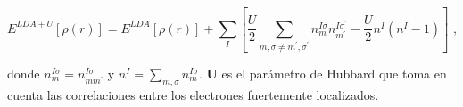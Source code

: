 \begin{equation}\label{hubb_rescrito}
E^{LDA+U} [\rho (r)]= E^{LDA} [\rho (r)] + \sum _{I} \left[ \frac{U}{2} \sum 
_{m,\sigma \neq m^{\prime},\sigma ^{\prime}} n_{m}^{I\sigma} 
n_{m^{\prime}}^{I\sigma ^{\prime}} - \frac{U}{2} n^{I}(n^{I}-1) \right] 
\textrm{ ,}
\end{equation}

\noindent donde $n_{m}^{I\sigma} = n_{mm^{\prime}}^{I\sigma}$ y $n^{I} = \sum 
_{m,\sigma 
} n_{m}^{I\sigma }$. \textbf{U} es el par\'ametro de Hubbard que toma en 
cuenta las correlaciones entre los electrones fuertemente localizados.